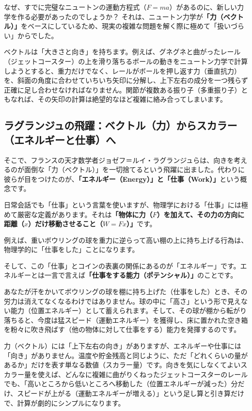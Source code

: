 なぜ、すでに完璧なニュートンの運動方程式（\(F=ma\)）があるのに、新しい力学を作る必要があったのでしょうか？ それは、ニュートン力学が\textbf{「力（ベクトル）」}をベースにしているため、現実の複雑な問題を解く際に極めて「扱いづらい」からでした。

ベクトルは「大きさと向き」を持ちます。例えば、グネグネと曲がったレール（ジェットコースター）の上を滑り落ちるボールの動きをニュートン力学で計算しようとすると、重力だけでなく、レールがボールを押し返す力（垂直抗力）を、斜面の角度に合わせていちいち矢印に分解し、上下左右の成分を一つ残らず正確に足し合わせなければなりません。関節が複数ある振り子（多重振り子）ともなれば、その矢印の計算は絶望的なほど複雑に絡み合ってしまいます。

\subsection{ラグランジュの飛躍：ベクトル（力）からスカラー（エネルギーと仕事）へ}

そこで、フランスの天才数学者ジョゼフ＝ルイ・ラグランジュらは、向きを考えるのが面倒な「力（ベクトル）」を一切捨てるという飛躍に出ました。代わりに彼らが目をつけたのが、\textbf{「エネルギー（Energy）」と「仕事（Work）」}という概念です。

日常会話でも「仕事」という言葉を使いますが、物理学における「仕事」には極めて厳密な定義があります。それは\textbf{「物体に力（\(F\)）を加えて、その力の方向に距離（\(x\)）だけ移動させること（\(W=Fx\)）」}です。

例えば、重いボウリングの球を重力に逆らって高い棚の上に持ち上げる行為は、物理学的に「仕事をした」ことになります。

そして、この「仕事」とコインの表裏の関係にあるのが「エネルギー」です。エネルギーとは一言で言えば\textbf{「仕事をする能力（ポテンシャル）」}のことです。

あなたが汗をかいてボウリングの球を棚に持ち上げた（仕事をした）とき、その労力は消えてなくなるわけではありません。球の中に「高さ」という形で見えない能力（位置エネルギー）として蓄えられます。そして、その球が棚から転がり落ちると、今度は猛スピード（運動エネルギー）を獲得し、床に置かれた空き箱を粉々に吹き飛ばす（他の物体に対して仕事をする）能力を発揮するのです。

力（ベクトル）には「上下左右の向き」がありますが、エネルギーや仕事には「向き」がありません。温度や貯金残高と同じように、ただ「どれくらいの量があるか」だけを表す単なる数値（スカラー量）です。向きを気にしなくてよいスカラー量を使えば、どんなに複雑に曲がりくねったジェットコースターのレールでも、「高いところから低いところへ移動した（位置エネルギーが減った）分だけ、スピードが上がる（運動エネルギーが増える）」という足し算と引き算だけで、計算が劇的にシンプルになります。

